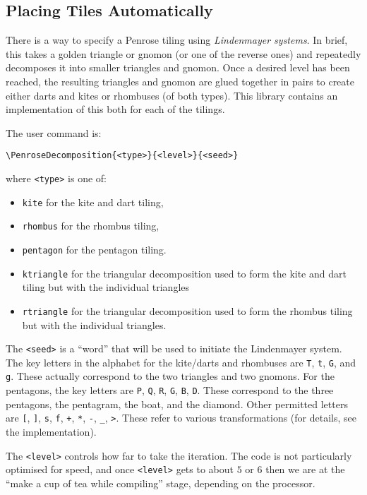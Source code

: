 \documentclass{ltxdoc}
\begin{document}
\subsection{Placing Tiles Automatically}

There is a way to specify a Penrose tiling using \emph{Lindenmayer systems}.
In brief, this takes a golden triangle or gnomon (or one of the reverse ones) and repeatedly decomposes it into smaller triangles and gnomon.
Once a desired level has been reached, the resulting triangles and gnomon are glued together in pairs to create either darts and kites or rhombuses (of both types).
This library contains an implementation of this both for each of the tilings.

The user command is:
%
\begin{verbatim}
\PenroseDecomposition{<type>}{<level>}{<seed>}
\end{verbatim}
%
where \Verb+<type>+ is one of:
%
\begin{itemize}
\item \Verb+kite+ for the kite and dart tiling,
\item \Verb+rhombus+ for the rhombus tiling,
\item \Verb+pentagon+ for the pentagon tiling.
\item \Verb+ktriangle+ for the triangular decomposition used to form the kite and dart tiling but with the individual triangles
\item \Verb+rtriangle+ for the triangular decomposition used to form the rhombus tiling but with the individual triangles.
\end{itemize}

The \Verb+<seed>+ is a ``word'' that will be used to initiate the Lindenmayer system.
The key letters in the alphabet for the kite/darts and rhombuses are \Verb+T+, \Verb+t+, \Verb+G+, and \Verb+g+.
These actually correspond to the two triangles and two gnomons.
For the pentagons, the key letters are \Verb+P+, \Verb+Q+, \Verb+R+, \Verb+G+, \Verb+B+, \Verb+D+.
These correspond to the three pentagons, the pentagram, the boat, and the diamond.
Other permitted letters are \Verb+[+, \Verb+]+, \Verb+s+, \Verb+f+, \Verb!+!, \Verb+*+, \Verb+-+, \Verb+_+, \Verb+>+.
These refer to various transformations (for details, see the implementation).

The \Verb+<level>+ controls how far to take the iteration.
The code is not particularly optimised for speed, and once \Verb+<level>+ gets to about \(5\) or \(6\) then we are at the ``make a cup of tea while compiling'' stage, depending on the processor.
\end{document}
